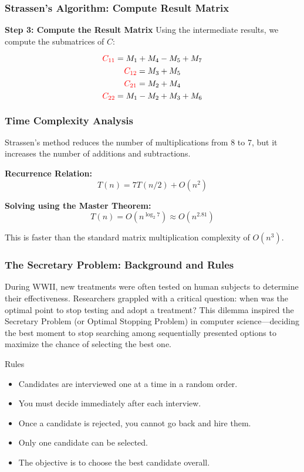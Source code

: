 \begin{frame}
    \frametitle{Strassen’s Algorithm: Compute Result Matrix}

    \textbf{Step 3: Compute the Result Matrix}  
    Using the intermediate results, we compute the submatrices of \( C \):

    \[
    \textcolor{red}{C_{11}} = M_1 + M_4 - M_5 + M_7
\]
\[
    \textcolor{red}{C_{12}} = M_3 + M_5
\]
\[
    \textcolor{red}{C_{21}} = M_2 + M_4
\]
\[
    \textcolor{red}{C_{22}} = M_1 - M_2 + M_3 + M_6
\]


\end{frame}

\begin{frame}
    \frametitle{Time Complexity Analysis}

    Strassen's method reduces the number of multiplications from 8 to 7, but it increases the number of additions and subtractions.

    \textbf{Recurrence Relation:}
    \[
    T(n) = 7T(n/2) + O(n^2)
    \]

    \textbf{Solving using the Master Theorem:}
    \[
    T(n) = O(n^{\log_2 7}) \approx O(n^{2.81})
    \]

    This is faster than the standard matrix multiplication complexity of \( O(n^3) \).
\end{frame}


\begin{frame}
  \frametitle{The Secretary Problem: Background and Rules}
  
  During WWII, new treatments were often tested on human subjects to determine their effectiveness. Researchers grappled with a critical question: when was the optimal point to stop testing and adopt a treatment? This dilemma inspired the Secretary Problem (or Optimal Stopping Problem) in computer science—deciding the best moment to stop searching among sequentially presented options to maximize the chance of selecting the best one.
  \begin{block}{Rules}
      \begin{itemize}
        \item Candidates are interviewed one at a time in a random order.
        \item You must decide immediately after each interview.
        \item Once a candidate is rejected, you cannot go back and hire them.
        \item Only one candidate can be selected.
        \item The objective is to choose the best candidate overall.
      \end{itemize}
    \end{block}  
\end{frame}



